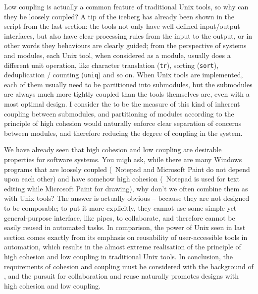 Low coupling is actually a common feature of traditional Unix tools, so why can
they be loosely coupled?  A tip of the iceberg has already been shown in the
script from the last section: the tools not only have well-defined input/output
interfaces, but also have clear processing rules from the input to the output,
or in other words they behaviours are clearly guided; from the perspective of
systems and modules, each Unix tool, when considered as a module, usually does
a different unit operation, like character translation (\verb|tr|), sorting
(\verb|sort|), deduplication / counting (\verb|uniq|) and so on.  When Unix
tools are implemented, each of them usually need to be partitioned into
submodules, but the submodules are always much more tightly coupled than the
tools themselves are, even with a most optimal design.  I consider the
 to be the measure of this kind of inherent coupling
between submodules, and partitioning of modules according to the principle of
high cohesion would naturally enforce clear separation of concerns between
modules, and therefore reducing the degree of coupling in the system.

We have already seen that high cohesion and low coupling are desirable
properties for software systems.  You migh ask, while there are many Windows
programs that are loosely coupled (\eg~Notepad and Microsoft Paint do not
depend upon each other) and have somehow high cohesion (\eg~Notepad is used
for text editing while Microsoft Paint for drawing), why don't we often combine
them as with Unix tools?  The answer is actually obvious -- because they are
not designed to be composable; to put it more explicitly, they cannot use some
simple yet general-purpose interface, like pipes, to collaborate, and therefore
cannot be easily reused in automated tasks.  In comparison, the power of
Unix seen in last section comes exactly from its emphasis on reusability of
user-accessible tools in automation, which results in the almost extreme
realisation of the principle of high cohesion and low coupling in traditional
Unix tools.  In conclusion, the requirements of cohesion
and coupling must be considered with the background of , and the pursuit for collaboration and reuse naturally
promotes designs with high cohesion and low coupling.

